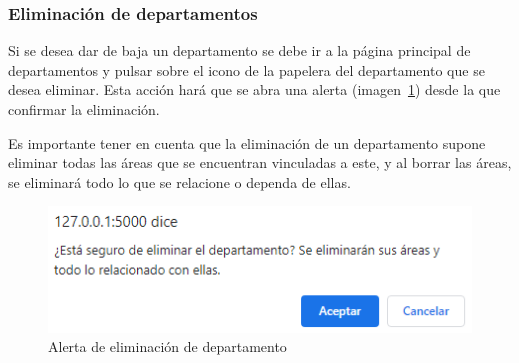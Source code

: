 \subsubsection{Eliminación de departamentos}
Si se desea dar de baja un departamento se debe ir a la página principal de departamentos y pulsar sobre el icono de la papelera del departamento que se desea eliminar.
Esta acción hará que se abra una alerta (imagen~\ref{pag:alertElDepartamento}) desde la que confirmar la eliminación.

Es importante tener en cuenta que la eliminación de un departamento supone eliminar todas las áreas que se encuentran vinculadas a este, y al borrar las áreas, se eliminará todo lo que se relacione o dependa de ellas.

\begin{figure}
	\centering
	\includegraphics[width=.6\textwidth]{../img/Anexos/Manual usuario/alertElDepartamento.png}
	\caption{Alerta de eliminación de departamento}\label{pag:alertElDepartamento}
\end{figure}
